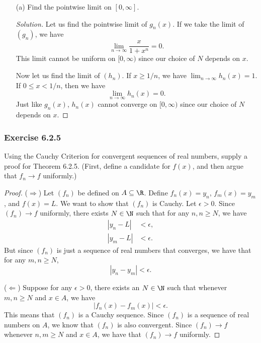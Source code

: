 \begin{enumerate}
    \item[(a)] Find the pointwise limit on \( [0,\infty ] \).
        \begin{proof}[Solution]
        Let us find the pointwise limit of \( g_n(x)  \). If we take the limit of \( (g_n) \), we have
        \[  \lim_{ n \to \infty  } \frac{ x  }{ 1 + x^n  } = 0. \] This limit cannot be uniform on \( [0,\infty ) \) since our choice of \( N  \) depends on \( x  \). 

        Now let us find the limit of \( (h_n)  \). If \( x \geq 1 / n  \), we have \( \lim_{  n \to \infty  } h_n(x) = 1  \). If \( 0 \leq x < 1 / n \), then we have 
        \[  \lim_{ n \to \infty  } h_n(x) = 0. \]
        Just like \( g_n(x)  \), \( h_n(x)  \) cannot converge on \( [0,\infty )  \) since our choice of \( N  \) depends on \( x  \).
        \end{proof}
\end{enumerate}



\subsubsection{Exercise 6.2.5}  Using the Cauchy Criterion for convergent sequences of real numbers, supply a proof for Theorem 6.2.5. (First, define a candidate for \( f(x)  \), and then argue that \( f_n \to f  \) uniformly.)

\begin{proof}
    (\( \Rightarrow \)) Let \( (f_n)  \) be defined on \( A \subseteq \R   \). Define \( f_n(x) = y_n  \), \( f_m(x) = y_m  \), and \( f(x) = L  \). We want to show that \( (f_n)  \) is Cauchy. Let \( \epsilon > 0  \). Since \( (f_n) \to f  \) uniformly, there exists \( N \in \N  \) such that for any \( n,n \geq N  \), we have 
\begin{align*}
    |y_n - L   | &< \epsilon,  \\
    | y_m - L  | &< \epsilon.
\end{align*}
But  since \( (f_n)  \) is just a sequence of real numbers that converges, we have that for any \( m,n \geq N  \), 
\[ | y_n - y_m  | < \epsilon. \]

(\( \Leftarrow \)) Suppose for any \( \epsilon > 0  \), there exists an \( N \in \N  \) such that whenever \( m,n \geq N  \) and \( x \in A \), we have 
\[  | f_n(x) - f_m(x)  | < \epsilon. \]
This means that \( (f_n)  \) is a Cauchy sequence. Since \( (f_n) \) is a sequence of real numbers on \( A  \), we know that \( (f_n)  \) is also convergent. Since \( (f_n) \to f  \) whenever \( n,m \geq N  \) and \( x \in A  \), we have that \( (f_n) \to f  \) uniformly.
\end{proof}

